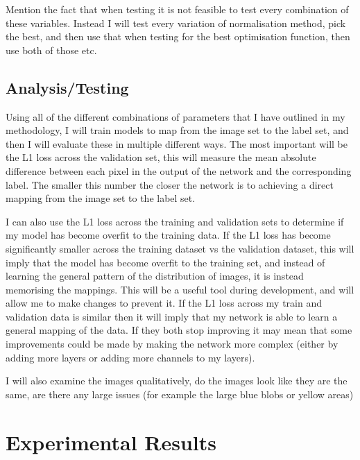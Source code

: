 \documentclass{UoYCSproject}
\begin{document}
Mention the fact that when testing it is not feasible to test every combination of these variables. Instead I will test every variation of normalisation method, pick the best, and then use that when testing for the best optimisation function, then use both of those etc. 

\section{Analysis/Testing}

Using all of the different combinations of parameters that I have outlined in my methodology, I will train models to map from the image set to the label set, and then I will evaluate these in multiple different ways. The most important will be the L1 loss across the validation set, this will measure the mean absolute difference between each pixel in the output of the network and the corresponding label. The smaller this number the closer the network is to achieving a direct mapping from the image set to the label set. 

I can also use the L1 loss across the training and validation sets to determine if my model has become overfit to the training data. If the L1 loss has become significantly smaller across the training dataset vs the validation dataset, this will imply that the model has become overfit to the training set, and instead of learning the general pattern of the distribution of images, it is instead memorising the mappings. This will be a useful tool during development, and will allow me to make changes to prevent it. If the L1 loss across my train and validation data is similar then it will imply that my network is able to learn a general mapping of the data. If they both stop improving it may mean that some improvements could be made by making the network more complex (either by adding more layers or adding more channels to my layers). 

I will also examine the images qualitatively, do the images look like they are the same, are there any large issues (for example the large blue blobs or yellow areas)

\newpage{}

\chapter{Experimental Results}


\end{document}
